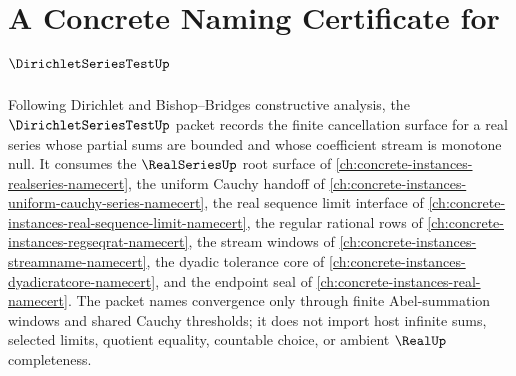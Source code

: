 \chapter{A Concrete Naming Certificate for $\DirichletSeriesTestUp$}
\label{ch:concrete-instances-dirichlet-series-test-namecert}

Following Dirichlet and Bishop--Bridges constructive analysis, the $\DirichletSeriesTestUp$ packet records the finite cancellation surface for a real series whose partial sums are bounded and whose coefficient stream is monotone null. It consumes the $\RealSeriesUp$ root surface of \autoref{ch:concrete-instances-realseries-namecert}, the uniform Cauchy handoff of \autoref{ch:concrete-instances-uniform-cauchy-series-namecert}, the real sequence limit interface of \autoref{ch:concrete-instances-real-sequence-limit-namecert}, the regular rational rows of \autoref{ch:concrete-instances-regseqrat-namecert}, the stream windows of \autoref{ch:concrete-instances-streamname-namecert}, the dyadic tolerance core of \autoref{ch:concrete-instances-dyadicratcore-namecert}, and the endpoint seal of \autoref{ch:concrete-instances-real-namecert}. The packet names convergence only through finite Abel-summation windows and shared Cauchy thresholds; it does not import host infinite sums, selected limits, quotient equality, countable choice, or ambient $\RealUp$ completeness.

